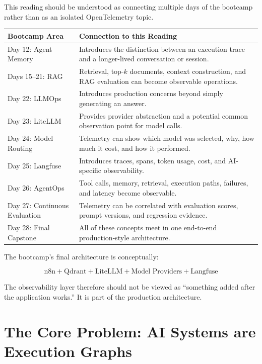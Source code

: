 \documentclass[11pt,a4paper]{article}
\begin{document}
This reading should be understood as connecting multiple days of the bootcamp rather than as an isolated OpenTelemetry topic.

\begin{table}[h]
\centering
\begin{tabular}{p{}p{}}
\toprule
\textbf{Bootcamp Area} & \textbf{Connection to this Reading} \\
\midrule
Day 12: Agent Memory &
Introduces the distinction between an execution trace and a longer-lived conversation or session. \\
\addlinespace
Days 15--21: RAG &
Retrieval, top-$k$ documents, context construction, and RAG evaluation can become observable operations. \\
\addlinespace
Day 22: LLMOps &
Introduces production concerns beyond simply generating an answer. \\
\addlinespace
Day 23: LiteLLM &
Provides provider abstraction and a potential common observation point for model calls. \\
\addlinespace
Day 24: Model Routing &
Telemetry can show which model was selected, why, how much it cost, and how it performed. \\
\addlinespace
Day 25: Langfuse &
Introduces traces, spans, token usage, cost, and AI-specific observability. \\
\addlinespace
Day 26: AgentOps &
Tool calls, memory, retrieval, execution paths, failures, and latency become observable. \\
\addlinespace
Day 27: Continuous Evaluation &
Telemetry can be correlated with evaluation scores, prompt versions, and regression evidence. \\
\addlinespace
Day 28: Final Capstone &
All of these concepts meet in one end-to-end production-style architecture. \\
\bottomrule
\end{tabular}
\end{table}

The bootcamp's final architecture is conceptually:

\[
\text{n8n}
+
\text{Qdrant}
+
\text{LiteLLM}
+
\text{Model Providers}
+
\text{Langfuse}
\]

The observability layer therefore should not be viewed as ``something added after the application works.'' It is part of the production architecture.

\section{The Core Problem: AI Systems are Execution Graphs}
\end{document}
